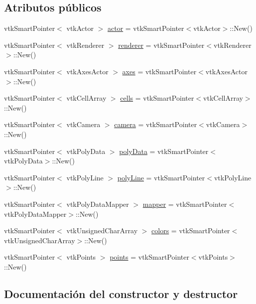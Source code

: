 \subsection*{Atributos públicos}
\begin{DoxyCompactItemize}
\item 
vtk\+Smart\+Pointer$<$ vtk\+Actor $>$ \hyperlink{class_graficador1_a8ae74354def8d4b9cf9a5888a3d5f7f6}{actor} = vtk\+Smart\+Pointer$<$vtk\+Actor$>$\+::New()
\item 
vtk\+Smart\+Pointer$<$ vtk\+Renderer $>$ \hyperlink{class_graficador1_a37f34d5e7cc90e5ce119de4b3c5e99a5}{renderer} = vtk\+Smart\+Pointer$<$vtk\+Renderer$>$\+::New()
\item 
vtk\+Smart\+Pointer$<$ vtk\+Axes\+Actor $>$ \hyperlink{class_graficador1_a2e21aceca117ab118ac832fab7069222}{axes} = vtk\+Smart\+Pointer$<$vtk\+Axes\+Actor$>$\+::New()
\item 
vtk\+Smart\+Pointer$<$ vtk\+Cell\+Array $>$ \hyperlink{class_graficador1_a0cfb1ed1aa24256300eba63ec3961be8}{cells} = vtk\+Smart\+Pointer$<$vtk\+Cell\+Array$>$\+::New()
\item 
vtk\+Smart\+Pointer$<$ vtk\+Camera $>$ \hyperlink{class_graficador1_a84c019e93c84cebb467b96fe51f7e00f}{camera} = vtk\+Smart\+Pointer$<$vtk\+Camera$>$\+::New()
\item 
vtk\+Smart\+Pointer$<$ vtk\+Poly\+Data $>$ \hyperlink{class_graficador1_a4a2f54d79982b0df5f89bc8ccc94f2ac}{poly\+Data} = vtk\+Smart\+Pointer$<$vtk\+Poly\+Data$>$\+::New()
\item 
vtk\+Smart\+Pointer$<$ vtk\+Poly\+Line $>$ \hyperlink{class_graficador1_a8104c16db84a43865caad8ee2a3956b9}{poly\+Line} = vtk\+Smart\+Pointer$<$vtk\+Poly\+Line$>$\+::New()
\item 
vtk\+Smart\+Pointer$<$ vtk\+Poly\+Data\+Mapper $>$ \hyperlink{class_graficador1_a1cf22b3f22afd3b46c4e7c2e2d24c5e7}{mapper} = vtk\+Smart\+Pointer$<$vtk\+Poly\+Data\+Mapper$>$\+::New()
\item 
vtk\+Smart\+Pointer$<$ vtk\+Unsigned\+Char\+Array $>$ \hyperlink{class_graficador1_a13a6fb8216c7abf42e3e0ce8a39df1b8}{colors} = vtk\+Smart\+Pointer$<$vtk\+Unsigned\+Char\+Array$>$\+::New()
\item 
vtk\+Smart\+Pointer$<$ vtk\+Points $>$ \hyperlink{class_graficador1_a27673da414293c9c86dffc22f8d18b60}{points} = vtk\+Smart\+Pointer$<$vtk\+Points$>$\+::New()
\end{DoxyCompactItemize}


\subsection{Documentación del constructor y destructor}
